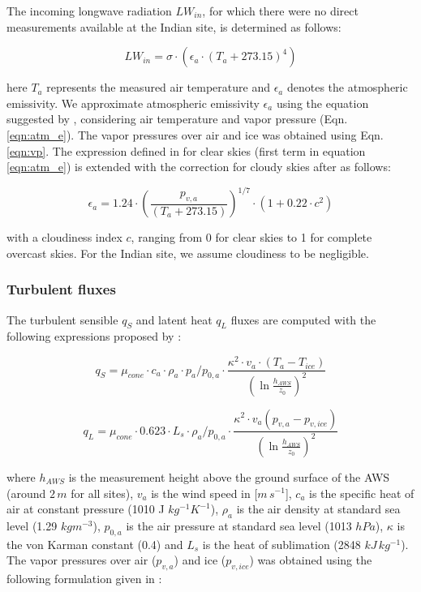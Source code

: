\documentclass[utf8]{frontiersSCNS} %
\begin{document}
The incoming longwave radiation $LW_{in}$, for which there were no direct measurements available at the Indian site, is determined
as follows:

\begin{equation} LW_{in}=\sigma \cdot (\epsilon_a \cdot {(T_a+ 273.15)}^4)
	\label{eqn:LWin} \end{equation}

here  $T_a$ represents the measured air temperature and $\epsilon_a$ denotes the atmospheric emissivity. We approximate atmospheric emissivity $\epsilon_a$ using the
equation suggested by \cite{Brutsaert_1982}, considering air temperature and vapor pressure (Eqn.  \ref{eqn:atm_e}). The
vapor pressures over air and ice was obtained using Eqn. \ref{eqn:vp}.  The expression defined in \cite{Brutsaert_1975}
for clear skies (first term in equation \ref{eqn:atm_e}) is extended with the correction for cloudy skies after
\cite{Brutsaert_1982} as follows:

\begin{equation} \epsilon_a=1.24 \cdot (\frac{p_{v,a}}{(T_a+273.15)})^{1/7}\cdot(1+0.22\cdot{c}^2) \label{eqn:atm_e}
\end{equation}

with a cloudiness index $c$, ranging from 0 for clear skies to 1 for complete overcast skies. For the Indian site, we
assume cloudiness to be negligible.

\subsubsection{Turbulent fluxes }

The turbulent sensible $q_{S}$ and latent heat $q_{L}$ fluxes are computed with the following expressions proposed by
\cite{Garratt_1992}:

\begin{equation} q_{S}=\mu_{cone}\cdot c_{a} \cdot \rho_{a} \cdot p_{a}/p_{0,a} \cdot \frac{\kappa^2 \cdot v_a \cdot
		(T_a-T_{ice})}{{(\ln{\frac{h_{AWS}}{z_{0}}})}^2} \label{eqn:qs} \end{equation}

\begin{equation} q_{L}=\mu_{cone}\cdot 0.623 \cdot L_s \cdot \rho_{a}/p_{0,a} \cdot \frac{\kappa^2 \cdot
	v_a(p_{v,a}-p_{v,ice})}{{(\ln{\frac{h_{AWS}}{z_{0}}})}^2} \end{equation}

where $h_{AWS}$ is the measurement height above the ground surface of the AWS (around $2\,m$ for all sites), $v_a$ is
the wind speed in [$m\,s^{-1}$], $c_a$ is the specific heat of air at constant pressure (1010 J $kg^{-1} K^{-1}$),
$\rho_{a}$ is the air density at standard sea level (1.29 $kg m^{-3}$), $p_{0,a}$ is the air pressure at standard sea
level (1013 $hPa$), $\kappa$ is the von Karman constant (0.4) and $L_s$ is the heat of sublimation (2848 $kJ\,
	kg^{-1}$).  The vapor pressures over air ($p_{v,a}$) and ice ($p_{v,ice}$) was obtained using the following formulation
given in \cite{WMO_2018}:
\end{document}
